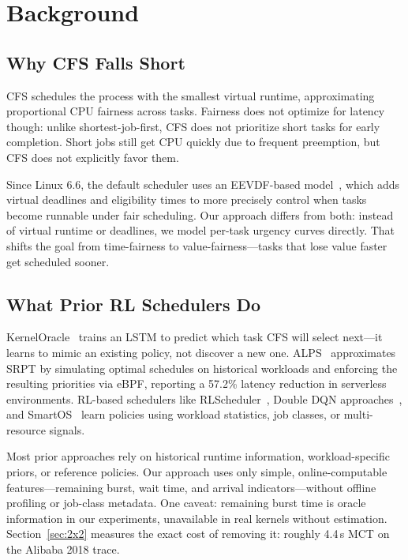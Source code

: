 \documentclass[10pt,twocolumn]{article}
\theoremstyle{remark}
\begin{document}
\section{Background}

\subsection{Why CFS Falls Short}

CFS schedules the process with the smallest virtual runtime,
approximating proportional CPU fairness across tasks. Fairness does
not optimize for latency though: unlike shortest-job-first, CFS does
not prioritize short tasks for early completion. Short jobs still get
CPU quickly due to frequent preemption, but CFS does not explicitly
favor them.

Since Linux 6.6, the default scheduler uses an EEVDF-based
model~\cite{eevdf}, which adds virtual deadlines and eligibility
times to more precisely control when tasks become runnable under fair
scheduling. Our approach differs from both: instead of virtual
runtime or deadlines, we model per-task urgency curves directly. That
shifts the goal from time-fairness to value-fairness---tasks that
lose value faster get scheduled sooner.

\subsection{What Prior RL Schedulers Do}

KernelOracle~\cite{kernelOracle} trains an LSTM to predict which
task CFS will select next---it learns to mimic an existing policy,
not discover a new one. ALPS~\cite{alps} approximates SRPT by
simulating optimal schedules on historical workloads and enforcing
the resulting priorities via eBPF, reporting a 57.2\% latency
reduction in serverless environments. RL-based schedulers like
RLScheduler~\cite{rlscheduler}, Double DQN approaches~\cite{doubleDQN},
and SmartOS~\cite{smartOS} learn policies using workload statistics,
job classes, or multi-resource signals.

Most prior approaches rely on historical runtime information,
workload-specific priors, or reference policies. Our approach uses
only simple, online-computable features---remaining burst, wait time,
and arrival indicators---without offline profiling or job-class
metadata. One caveat: remaining burst time is oracle information in
our experiments, unavailable in real kernels without estimation.
Section~\ref{sec:2x2} measures the exact cost of removing it:
roughly 4.4\,s MCT on the Alibaba 2018 trace.
\end{document}
